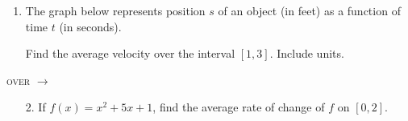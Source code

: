 \documentclass[11pt]{article}
\begin{document}
\pagestyle{empty}
\newsavebox{\quizfront}
\begin{lrbox}{\quizfront}
\begin{minipage}[top][4.5in][t]{\textwidth} \setlength{\parindent}{1.5em}
\drawtitle
\vspace{-0.5in}
\begin{enumerate}

\item The graph below represents position $s$ of an object (in feet)
  as a function of time $t$ (in seconds).
  \vspace{-.35in}
  \begin{center}
  \end{center}
  \vspace{-.25in}
  Find the average velocity over the interval $[1,3]$. Include units.

  \vfill

\end{enumerate}
\begin{flushright}
\textsc{over} $\longrightarrow$
\end{flushright}



\end{minipage}
\end{lrbox}

\newsavebox{\quizback}
\begin{lrbox}{\quizback}
\begin{minipage}[top][4.5in][t]{\textwidth} \setlength{\parindent}{1.5em}
\begin{itemize}
\item[2.] If $f(x) = x^2 + 5x + 1$, find the average rate of change of
  $f$ on $[0,2]$.


\end{itemize}
\end{minipage}
\end{lrbox}
\end{document}
